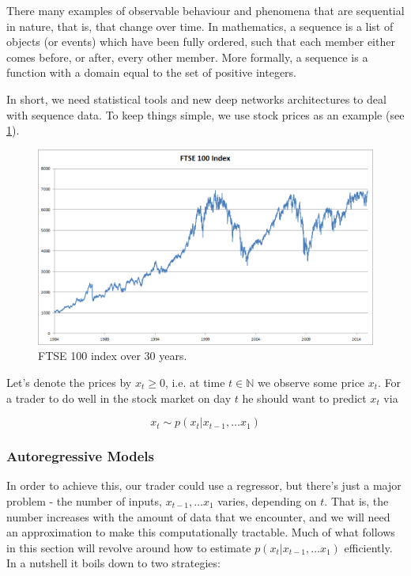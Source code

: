 There many examples of observable behaviour and phenomena that are sequential in nature, that is, that change over time. In mathematics, a sequence is a list of objects (or events) which have been fully ordered, such that each member either comes before, or after, every other member. More formally, a sequence is a function with a domain equal to the set of positive integers.

In short, we need statistical tools and new deep networks architectures to deal with sequence data. To keep things simple, we use stock prices as an example (see \cref{fig:ftse100}).

\begin{figure}[hpt]
	\centering
	\includegraphics[scale=0.5]{images/ch3/ftse100.png}
	\caption{FTSE 100 index over 30 years.}
	\label{fig:ftse100}
\end{figure}

Let’s denote the prices by $x_t \geq 0$, i.e. at time $t \in \mathbb{N}$ we observe some price $x_t$. For a trader to do well in the stock market on day $t$ he should want to predict $x_t$ via

$$x_t \sim p(x_t|x_{t-1}, \ldots x_1)$$

\subsubsection{Autoregressive Models}

In order to achieve this, our trader could use a regressor, but there’s just a major problem - the number of inputs, $x_{t-1}, \ldots x_1$ varies, depending on $t$. That is, the number increases with the amount of data that we encounter, and we will need an approximation to make this computationally tractable. Much of what follows in this section will revolve around how to estimate $p(x_t|x_{t-1}, \ldots x_1)$ efficiently. In a nutshell it boils down to two strategies:

